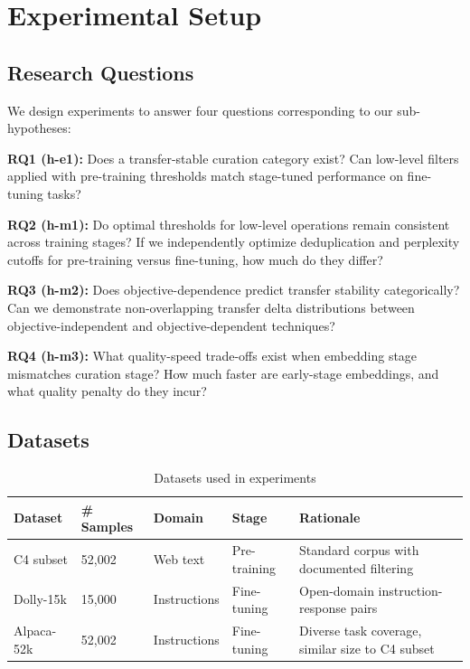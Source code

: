\section{Experimental Setup}

\subsection{Research Questions}

We design experiments to answer four questions corresponding to our sub-hypotheses:

\textbf{RQ1 (h-e1):} Does a transfer-stable curation category exist? Can low-level filters applied with pre-training thresholds match stage-tuned performance on fine-tuning tasks?

\textbf{RQ2 (h-m1):} Do optimal thresholds for low-level operations remain consistent across training stages? If we independently optimize deduplication and perplexity cutoffs for pre-training versus fine-tuning, how much do they differ?

\textbf{RQ3 (h-m2):} Does objective-dependence predict transfer stability categorically? Can we demonstrate non-overlapping transfer delta distributions between objective-independent and objective-dependent techniques?

\textbf{RQ4 (h-m3):} What quality-speed trade-offs exist when embedding stage mismatches curation stage? How much faster are early-stage embeddings, and what quality penalty do they incur?

\subsection{Datasets}

\begin{table}[h]
\centering
\small
\begin{tabular}{lllll}
\toprule
\textbf{Dataset} & \textbf{\# Samples} & \textbf{Domain} & \textbf{Stage} & \textbf{Rationale} \\
\midrule
C4 subset & 52,002 & Web text & Pre-training & Standard corpus with documented filtering \\
Dolly-15k & 15,000 & Instructions & Fine-tuning & Open-domain instruction-response pairs \\
Alpaca-52k & 52,002 & Instructions & Fine-tuning & Diverse task coverage, similar size to C4 subset \\
\bottomrule
\end{tabular}
\caption{Datasets used in experiments}
\end{table}

